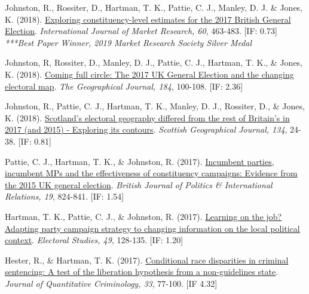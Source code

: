 \documentclass[12pt]{article}
\begin{document}
\begin{bibenum}
	\item Johnston, R., Rossiter, D., {Hartman, T. K.}, Pattie, C. J., 
		   Manley, D. J. \&  Jones, K. (2018). 
		  \href{https://10.1177/1470785318778247}
		  {Exploring constituency-level estimates for the 2017 British General Election}.
		  \emph{International Journal of Market Research, 60}, 463-483. [IF: 0.73]\\
		  \textit{***Best Paper Winner, 2019 Market Research Society Silver Medal}

	\item Johnston, R, Rossiter, D., Manley, D. J., Pattie, C. J., 
		  {Hartman, T. K.}, \& Jones, K. (2018).
		  \href{https://10.1111/geoj.12240}
		  {Coming full circle: 
		  The 2017 UK General Election and the changing electoral map}. 
		  \emph{The Geographical Journal, 184}, 100-108. [IF: 2.36]
          
	\item Johnston, R., Pattie, C. J., {Hartman, T. K.}, Manley, D. J., 
		  Rossiter, D., \& Jones, K. (2018).
		  \href{https://10.1080/14702541.2017.1409362}
		  {Scotland's electoral geography 
		  differed from the rest of Britain's in 2017 (and 2015) - 
		  Exploring its contours}. 
		  \emph{Scottish Geographical Journal, 134}, 24-38. [IF: 0.81]
          
    \item Pattie, C. J., {Hartman, T. K.}, \& Johnston, R. (2017).
          \href{https://10.1177/1369148117718710}
          {Incumbent parties, incumbent MPs and the effectiveness of 
          constituency campaigns: Evidence from the 2015 UK general election}.
           \emph{British Journal of Politics \& International Relations, 19}, 824-841. [IF: 1.54]
          
    \item {Hartman, T. K.}, Pattie, C. J., \& Johnston, R. (2017).
    		\href{https://10.1016/j.electstud.2017.06.005}
          {Learning on the job? Adapting party campaign strategy 
          to changing information on the local political context}. 
          \emph{Electoral Studies, 49}, 128-135. [IF: 1.20]
          
    \item Hester, R., \& {Hartman, T. K.} (2017). 
          \href{https://10.1007/s10940-016-9283-z}
          {Conditional race disparities in criminal sentencing: 
          A test of the liberation hypothesis from a non-guidelines state}. 
          \emph{Journal of Quantitative Criminology, 33}, 77-100. [IF 4.32]
          

\end{bibenum}
\end{document}
